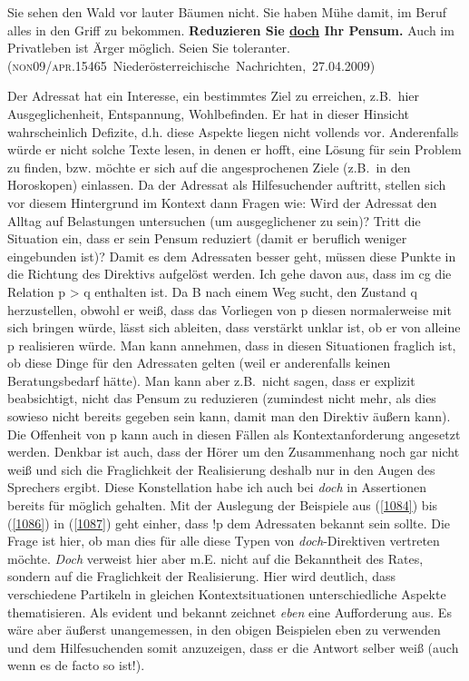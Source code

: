 \begin{exe}
	\ex\label{1086} 

	Sie sehen den Wald vor lauter Bäumen nicht. Sie haben Mühe damit, im Beruf alles in den Griff zu bekommen. \textbf{Reduzieren Sie \ul{doch} Ihr 		Pensum.} Auch im Privatleben ist Ärger möglich. Seien Sie toleranter.	
	\newline\hbox{}\hfill\hbox{(\textsc{non09/apr.15465} Niederösterreichische Nachrichten, 27.04.2009)} 				     
\end{exe}\largerpage
Der Adressat hat ein Interesse, ein bestimmtes Ziel zu erreichen, z.B.\ hier Ausgeglichenheit, Entspannung, Wohlbefinden. Er hat in dieser Hinsicht wahrscheinlich Defizite, d.h. diese Aspekte liegen nicht vollends vor. Anderenfalls würde er nicht solche Texte lesen, in denen er hofft, eine Lösung für sein Problem zu finden, bzw. möchte er sich auf die angesprochenen Ziele (z.B.\ in den Horoskopen) einlassen. Da der Adressat als Hilfesuchender auftritt, stellen sich vor diesem Hintergrund im Kontext dann Fragen wie: Wird der Adressat den Alltag auf Belastungen untersuchen (um ausgeglichener zu sein)? Tritt die Situation ein, dass er sein Pensum reduziert (damit er beruflich weniger eingebunden ist)? Damit es dem Adressaten besser geht, müssen diese Punkte in die Richtung des Direktivs aufgelöst werden. Ich gehe davon aus, dass im cg die Relation p > q ent\-halten ist. Da B nach einem Weg sucht, den Zustand q herzustellen, obwohl er weiß, dass das Vorliegen von p diesen normalerweise mit sich bringen würde, lässt sich ableiten, dass verstärkt unklar ist, ob er von alleine p realisieren würde. Man kann annehmen, dass in diesen Situationen fraglich ist, ob diese Dinge für den Adressaten gelten (weil er anderenfalls keinen Beratungsbedarf hätte). Man kann aber z.B.\ nicht sagen, dass er explizit beabsichtigt, nicht das Pensum zu reduzieren (zumindest nicht mehr, als dies sowieso nicht bereits gegeben sein kann, damit man den Direktiv äußern kann). Die Offenheit von p kann auch in diesen Fällen als Kontextanforderung angesetzt werden. Denkbar ist auch, dass der Hörer um den Zusammenhang noch gar nicht weiß und sich die Fraglichkeit der Realisierung deshalb nur in den Augen des Sprechers ergibt. Diese Konstellation habe ich auch bei \textit{doch} in Assertionen bereits für möglich gehalten. Mit der Auslegung der Beispiele aus (\ref{1084}) bis (\ref{1086}) in (\ref{1087}) geht einher, dass !p dem Adressaten bekannt sein sollte. Die Frage ist hier, ob man dies für alle diese Typen von \textit{doch}-Direktiven vertreten möchte. \textit{Doch} verweist hier aber m.E. nicht auf die Bekanntheit des Rates, sondern auf die Fraglichkeit der Realisierung. Hier wird deutlich, dass verschiedene Partikeln in gleichen Kontextsituationen unterschiedliche Aspekte thematisieren. Als evident und bekannt zeichnet \textit{eben} eine Aufforderung aus. Es wäre aber äußerst unangemessen, in den obigen Beispielen eben zu verwenden und dem Hilfesuchenden somit anzuzeigen, dass er die Antwort selber weiß (auch wenn es de facto so ist!).
	
